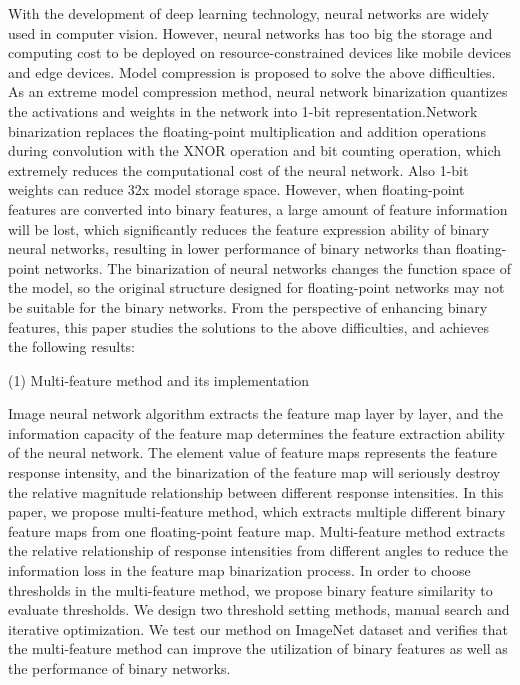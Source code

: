 \begin{abstract*}
  With the development of deep learning technology, neural networks are widely used in computer vision. However, neural networks has too big the storage and computing cost to be deployed on resource-constrained devices like mobile devices and edge devices. Model compression is proposed to solve the above difficulties. As an extreme model compression method, neural network binarization quantizes the activations ​​and weights in the network into 1-bit representation.Network binarization replaces the floating-point multiplication and addition operations during convolution with the XNOR operation and bit counting operation, which extremely reduces the computational cost of the neural network. Also 1-bit weights can reduce 32x model storage space. However, when floating-point features are converted into binary features, a large amount of feature information will be lost, which significantly reduces the feature expression ability of binary neural networks, resulting in lower performance of binary networks than floating-point networks. The binarization of neural networks changes the function space of the model, so the original structure designed for floating-point networks may not be suitable for the binary networks. From the perspective of enhancing binary features, this paper studies the solutions to the above difficulties, and achieves the following results:

  (1) Multi-feature method and its implementation

  Image neural network algorithm extracts the feature map layer by layer, and the information capacity of the feature map determines the feature extraction ability of the neural network. The element value of feature maps represents the feature response intensity, and the binarization of the feature map will seriously destroy the relative magnitude relationship between different response intensities. In this paper, we propose multi-feature method, which extracts multiple different binary feature maps from one floating-point feature map. Multi-feature method extracts the relative relationship of response intensities from different angles to reduce the information loss in the feature map binarization process. In order to choose thresholds in the multi-feature method, we propose binary feature similarity to evaluate thresholds. We design two threshold setting methods, manual search and iterative optimization. We test our method on ImageNet dataset and verifies that the multi-feature method can improve the utilization of binary features as well as the performance of binary networks.


\end{abstract*}
